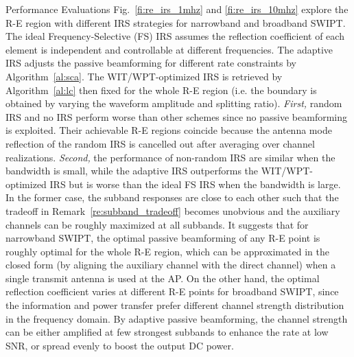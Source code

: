 \documentclass[journal]{IEEEtran}
\begin{document}
\begin{section}{Performance Evaluations}
		Fig.~\ref{fi:re_irs_1mhz} and \ref{fi:re_irs_10mhz} explore the R-E region with different IRS strategies for narrowband and broadband SWIPT. The ideal Frequency-Selective (FS) IRS assumes the reflection coefficient of each element is independent and controllable at different frequencies. The adaptive IRS adjusts the passive beamforming for different rate constraints by Algorithm~\ref{al:sca}. The WIT/WPT-optimized IRS is retrieved by Algorithm~\ref{al:lc} then fixed for the whole R-E region (i.e. the boundary is obtained by varying the waveform amplitude and splitting ratio). \textit{First,} random IRS and no IRS perform worse than other schemes since no passive beamforming is exploited. Their achievable R-E regions coincide because the antenna mode reflection of the random IRS is cancelled out after averaging over channel realizations. \textit{Second,} the performance of non-random IRS are similar when the bandwidth is small, while the adaptive IRS outperforms the WIT/WPT-optimized IRS but is worse than the ideal FS IRS when the bandwidth is large. In the former case, the subband responses are close to each other such that the tradeoff in Remark~\ref{re:subband_tradeoff} becomes unobvious and the auxiliary channels can be roughly maximized at all subbands. It suggests that for narrowband SWIPT, the optimal passive beamforming of any R-E point is roughly optimal for the whole R-E region, which can be approximated in the closed form (by aligning the auxiliary channel with the direct channel) when a single transmit antenna is used at the AP. On the other hand, the optimal reflection coefficient varies at different R-E points for broadband SWIPT, since the information and power transfer prefer different channel strength distribution in the frequency domain. By adaptive passive beamforming, the channel strength can be either amplified at few strongest subbands to enhance the rate at low SNR, or spread evenly to boost the output DC power.





\end{section}
\end{document}
